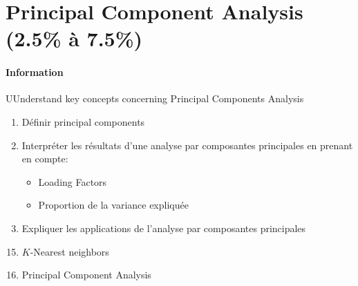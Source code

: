 \documentclass[12pt, titlepage, french]{report}
\begin{document}

\newpage
\chapter[Principal Component Analysis]{Principal Component Analysis (2.5\% à 7.5\%)}

\subsubsection{Information}

\begin{distributions}[Objective]
UUnderstand key concepts concerning Principal Components Analysis
\end{distributions}

\begin{outcomes}
\begin{enumerate}
	\item	Définir \og principal components \fg{} 
	\item	Interpréter les résultats d'une analyse par composantes principales en prenant en compte:
	\begin{itemize}
		\item	\og Loading Factors \fg{} 
		\item	Proportion de la variance expliquée
	\end{itemize}
	\item	Expliquer les applications de l'analyse par composantes principales
\end{enumerate}
\end{outcomes}

\begin{ASM_chapter}
\begin{enumerate}
  \setcounter{enumi}{14}
	\item	$K$-Nearest neighbors
  \setcounter{enumi}{16}
	\item	Principal Component Analysis
\end{enumerate}
\end{ASM_chapter}
\end{document}
